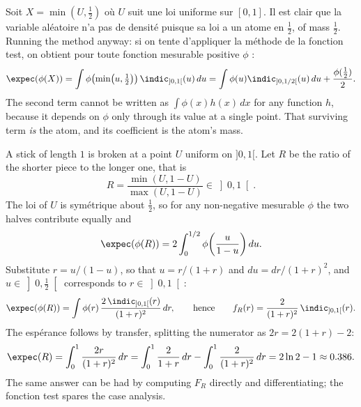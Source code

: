 \begin{example}
  Soit $X = \min(U,\tfrac12)$ où $U$ suit une loi uniforme sur $[0,1]$. Il est
  clair que la variable aléatoire n'a pas de densité puisque sa loi a un atome en
  $\tfrac12$, of mass $\tfrac12$. Running the method anyway: si on tente
  d'appliquer la méthode de la fonction test, on obtient pour toute fonction
  mesurable positive $\phi$ :
  \[
    \expec(\phi(X)) = \int \phi\!\left(\min\!\left(u,\tfrac12\right)\right)\indic_{]0,1[}(u)\,du
      = \int \phi(u)\indic_{]0,1/2[}(u)\,du + \frac{\phi(\tfrac12)}{2} .
  \]
  The second term cannot be written as $\int \phi(x) h(x)\,dx$ for any function
  $h$, because it depends on $\phi$ only through its value at a single point.
  That surviving term \emph{is} the atom, and its coefficient is the atom's mass.
\end{example}

\begin{example}
  A stick of length $1$ is broken at a point $U$ uniform on $]0,1[$. Let $R$ be
  the ratio of the shorter piece to the longer one, that is
  \[
    R = \frac{\min(U,1-U)}{\max(U,1-U)} \in \left]0,1\right[ .
  \]
  The loi of $U$ is symétrique about $\tfrac12$, so for any non-negative
  mesurable $\phi$ the two halves contribute equally and
  \[
    \expec(\phi(R)) = 2\int_{0}^{1/2} \phi\!\left(\frac{u}{1-u}\right) du .
  \]
  Substitute $r = u/(1-u)$, so that $u = r/(1+r)$ and
  $du = dr/(1+r)^{2}$, and $u \in \left]0,\tfrac12\right[$ corresponds to
  $r \in \left]0,1\right[$:
  \[
    \expec(\phi(R)) = \int \phi(r)\,\frac{2\,\indic_{]0,1[}(r)}{(1+r)^{2}}\,dr ,
    \qquad\text{hence}\qquad
    f_{R}(r) = \frac{2}{(1+r)^{2}}\,\indic_{]0,1[}(r).
  \]
  The espérance follows by transfer, splitting the numerator as
  $2r = 2(1+r) - 2$:
  \[
    \expec(R) = \int_{0}^{1} \frac{2r}{(1+r)^{2}}\,dr
      = \int_{0}^{1} \frac{2}{1+r}\,dr - \int_{0}^{1} \frac{2}{(1+r)^{2}}\,dr
      = 2\ln 2 - 1 \approx 0.386 .
  \]
  The same answer can be had by computing $F_{R}$ directly and differentiating;
  the fonction test spares the case analysis.
\end{example}

